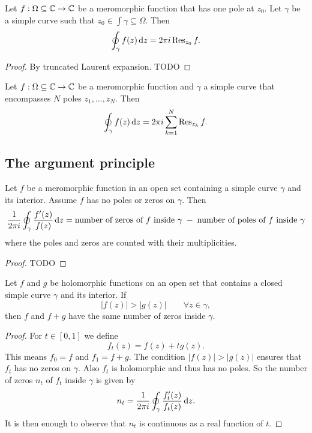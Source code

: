 \begin{proposition}
Let $f: \Omega\subseteq \mathbb{C}\to \mathbb{C}$ be a meromorphic function that has one pole at $z_0$. Let $\gamma$ be a simple curve such that $z_0\in \int\gamma \subseteq \Omega$. Then
\[ \oint_\gamma f(z) \operatorname{d \!}{z} = 2\pi i \operatorname{Res}_{z_0}f. \]
\end{proposition}
\begin{proof}
By truncated Laurent expansion. TODO
\end{proof}
\begin{corollary}
Let $f: \Omega\subseteq \mathbb{C}\to \mathbb{C}$ be a meromorphic function and $\gamma$ a simple curve that encompasses $N$ poles $z_1, \ldots, z_N$. Then
\[ \oint_{\gamma} f(z)\operatorname{d \!}{z} = 2\pi i \sum_{k=1}^N\operatorname{Res}_{z_k}f. \]
\end{corollary}

\subsection{The argument principle}
\begin{proposition}
Let $f$ be a meromorphic function in an open set containing a simple curve $\gamma$ and its interior. Assume $f$ has no poles or zeros on $\gamma$. Then
\[ \frac{1}{2\pi i}\oint_\gamma \frac{f'(z)}{f(z)}\operatorname{d \!}{z} = \text{number of zeros of $f$ inside $\gamma$} \;-\; \text{number of poles of $f$ inside $\gamma$} \]
where the poles and zeros are counted with their multiplicities.
\end{proposition}
\begin{proof}
TODO
\end{proof}

\begin{theorem} \label{RoucheTheorem}
Let $f$ and $g$ be holomorphic functions on an open set that contains a closed simple curve $\gamma$ and its interior. If
\[ |f(z)| > |g(z)| \qquad \forall z\in \gamma, \]
then $f$ and $f+g$ have the same number of zeros inside $\gamma$.
\end{theorem}
\begin{proof}
For $t\in [0, 1]$ we define
\[ f_t(z) = f(z) + tg(z). \]
This means $f_0 = f$ and $f_1 = f+g$. The condition $|f(z)| > |g(z)|$ ensures that $f_t$ has no zeros on $\gamma$. Also $f_t$ is holomorphic and thus has no poles. So the number of zeros $n_t$ of $f_t$ inside $\gamma$ is given by
\[ n_t = \frac{1}{2\pi i}\oint_\gamma \frac{f_t'(z)}{f_t(z)}\operatorname{d \!}{z}. \]
It is then enough to observe that $n_t$ is continuous as a real function of $t$.
\end{proof}

